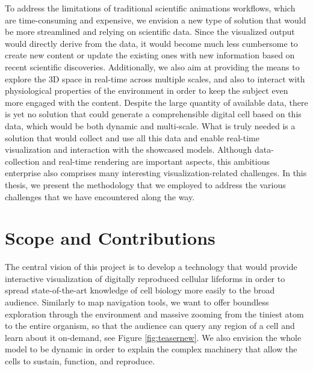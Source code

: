 To address the limitations of traditional scientific animations workflows, which are time-consuming and expensive, we envision a new type of solution that would be more streamlined and relying on scientific data.
Since the visualized output would directly derive from the data, it would become much less cumbersome to create new content or update the existing ones with new information based on recent scientific discoveries.
Additionally, we also aim at providing the means to explore the 3D space in real-time across multiple scales, and also to interact with physiological properties of the environment in order to keep the subject even more engaged with the content. 
Despite the large quantity of available data, there is yet no solution that could generate a comprehensible digital cell based on this data, which would be both dynamic and multi-scale.
What is truly needed is a solution that would collect and use all this data and enable real-time visualization and interaction with the showcased models. 
Although data-collection and real-time rendering are important aspects, this ambitious enterprise also comprises many interesting visualization-related challenges.
In this thesis, we present the methodology that we employed to address the various challenges that we have encountered along the way.

\section{Scope and Contributions}



The central vision of this project is to develop a technology that would provide interactive visualization of digitally reproduced cellular lifeforms in order to spread state-of-the-art knowledge of cell biology more easily to the broad audience.
Similarly to map navigation tools, we want to offer boundless exploration through the environment and massive zooming from the tiniest atom to the entire organism, so that the audience can query any region of a cell and learn about it on-demand, see Figure \ref{fig:teasernew}.
We also envision the whole model to be dynamic in order to explain the complex machinery that allow the cells to sustain, function, and reproduce.

